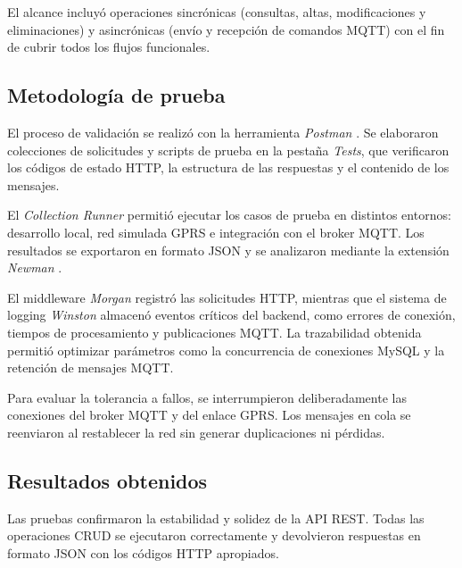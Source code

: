 El alcance incluyó operaciones sincrónicas (consultas, altas, modificaciones y eliminaciones) y asincrónicas (envío y recepción de comandos MQTT) con el fin de cubrir todos los flujos funcionales.

\subsection{Metodología de prueba}

El proceso de validación se realizó con la herramienta \textit{Postman} \cite{postman}. 
Se elaboraron colecciones de solicitudes y scripts de prueba en la pestaña \textit{Tests}, que verificaron los códigos de estado HTTP, la estructura de las respuestas y el contenido de los mensajes.  

El \textit{Collection Runner} \cite{postman_runner} permitió ejecutar los casos de prueba en distintos entornos: desarrollo local, red simulada GPRS e integración con el broker MQTT. 
Los resultados se exportaron en formato JSON y se analizaron mediante la extensión \textit{Newman} \cite{newman_postman}.  

El middleware \textit{Morgan} registró las solicitudes HTTP, mientras que el sistema de logging \textit{Winston} almacenó eventos críticos del backend, como errores de conexión, tiempos de procesamiento y publicaciones MQTT.  
La trazabilidad obtenida permitió optimizar parámetros como la concurrencia de conexiones MySQL y la retención de mensajes MQTT.

Para evaluar la tolerancia a fallos, se interrumpieron deliberadamente las conexiones del broker MQTT y del enlace GPRS. 
Los mensajes en cola se reenviaron al restablecer la red sin generar duplicaciones ni pérdidas.

\subsection{Resultados obtenidos}

Las pruebas confirmaron la estabilidad y solidez de la API REST.  
Todas las operaciones CRUD se ejecutaron correctamente y devolvieron respuestas en formato JSON con los códigos HTTP apropiados.  


